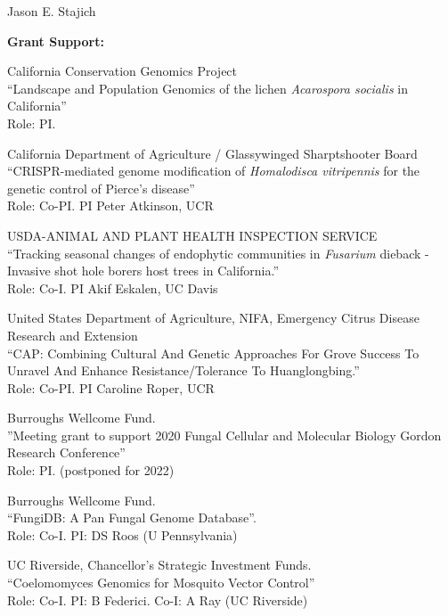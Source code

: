 \documentclass[10pt]{article}
\begin{document}
\begin{cv}{\centerline{Jason E. Stajich}}
\begin{cvlistcompact}{\bf Grant Support:}
\item [2020-2022] California Conservation Genomics Project \\
  ``Landscape and Population Genomics of the lichen \textit{Acarospora socialis} in California''  \\
Role: PI.

\item [2020-2023] California Department of Agriculture / Glassywinged Sharptshooter Board  \\
``CRISPR-mediated genome modification of \textit{Homalodisca vitripennis} for the genetic control of Pierce's disease'' \\
Role: Co-PI. PI Peter Atkinson, UCR

\item [2020-2021] USDA-ANIMAL AND PLANT HEALTH INSPECTION SERVICE \\
``Tracking seasonal changes of endophytic communities in \textit{Fusarium} dieback - Invasive shot hole borers host trees in California.'' \\
Role: Co-I. PI Akif Eskalen, UC Davis

\item [2020-2025] United States Department of Agriculture, NIFA, Emergency Citrus Disease Research and Extension \\
``CAP: Combining Cultural And Genetic Approaches For Grove Success To Unravel And Enhance Resistance/Tolerance To Huanglongbing.'' \\
Role: Co-PI. PI Caroline Roper, UCR


\item [2020] Burroughs Wellcome Fund. \\
''Meeting grant to support 2020 Fungal Cellular and Molecular Biology Gordon Research Conference'' \\
Role: PI. (postponed for 2022)

\item [{\bf Completed support}]
\item [2010-2013] Burroughs Wellcome Fund. \\
 ``FungiDB: A Pan Fungal Genome Database''. \\
Role: Co-I. PI: DS Roos (U Pennsylvania)

\item [2011-2012] UC Riverside, Chancellor's Strategic Investment
  Funds. \\
``Coelomomyces Genomics for Mosquito Vector Control'' \\
Role: Co-I. PI: B Federici. Co-I: A Ray (UC Riverside)


\end{cvlistcompact}
\end{cv}
\end{document}
